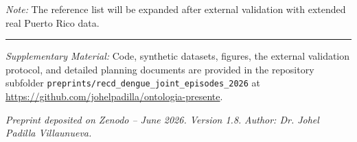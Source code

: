 \documentclass[11pt,a4paper]{article}
\begin{document}
\noindent\textit{Note:} The reference list will be expanded after external validation with extended real Puerto Rico data.

\vspace{0.6em}
\hrule
\vspace{0.5em}
\begin{sloppypar}
\noindent\textit{Supplementary Material:} Code, synthetic datasets, figures, the external validation protocol, and detailed planning documents are provided in the repository subfolder \texttt{preprints/recd\_dengue\_joint\_episodes\_2026} at \url{https://github.com/johelpadilla/ontologia-presente}.
\end{sloppypar}

\vspace{0.6em}
\noindent\textit{Preprint deposited on Zenodo – June 2026. Version 1.8.}  
\noindent\textit{Author: Dr. Johel Padilla Villaunueva.}
\end{document}
